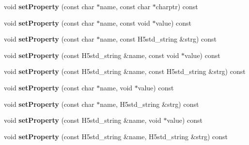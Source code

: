 \begin{DoxyCompactItemize}
\item 
\mbox{\label{class_h5_1_1_prop_list_aa7e7a408eebad6a2160e0c2d6bb55246}} 
void {\bfseries set\+Property} (const char $\ast$name, const char $\ast$charptr) const
\item 
\mbox{\label{class_h5_1_1_prop_list_aff5cffff34b5a4e4d4b689b0f4102424}} 
void {\bfseries set\+Property} (const char $\ast$name, const void $\ast$value) const
\item 
\mbox{\label{class_h5_1_1_prop_list_a3bb20b08fddf1403a2db92af755e9629}} 
void {\bfseries set\+Property} (const char $\ast$name, const H5std\+\_\+string \&strg) const
\item 
\mbox{\label{class_h5_1_1_prop_list_ab085489725cb90f86399b318f325e7cc}} 
void {\bfseries set\+Property} (const H5std\+\_\+string \&name, const void $\ast$value) const
\item 
\mbox{\label{class_h5_1_1_prop_list_a933044b4ea519714b197efcb379ae9a3}} 
void {\bfseries set\+Property} (const H5std\+\_\+string \&name, const H5std\+\_\+string \&strg) const
\item 
\mbox{\label{class_h5_1_1_prop_list_aa7191a0c3b1985a4ebd4d9e70a84cbce}} 
void {\bfseries set\+Property} (const char $\ast$name, void $\ast$value) const
\item 
\mbox{\label{class_h5_1_1_prop_list_aed5e7d2de920a0b53cc6ac2d627d0c1f}} 
void {\bfseries set\+Property} (const char $\ast$name, H5std\+\_\+string \&strg) const
\item 
\mbox{\label{class_h5_1_1_prop_list_a3f3957e7cc5007a39d7928ff3743e5ba}} 
void {\bfseries set\+Property} (const H5std\+\_\+string \&name, void $\ast$value) const
\item 
\mbox{\label{class_h5_1_1_prop_list_af1b5bc16f8f050906562269200af2872}} 
void {\bfseries set\+Property} (const H5std\+\_\+string \&name, H5std\+\_\+string \&strg) const
\item 
\mbox{\label{class_h5_1_1_prop_list_af56d66fd5309dbbbb69da716cf031661}} 

\end{DoxyCompactItemize}
